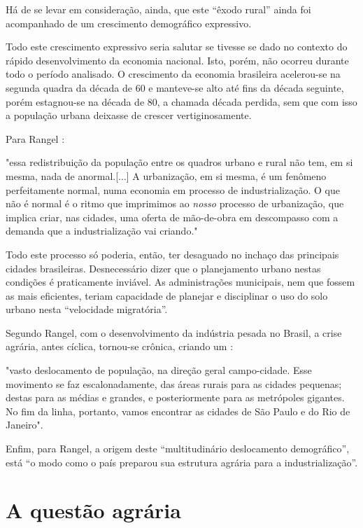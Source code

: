 \documentclass[
	12pt,				%
	oneside,			%
	a4paper,			%
	chapter=TITLE,		%
	section=TITLE,		%
	english,			%
	brazil				%
	]{abntex2}
\begin{document}
Há de se levar em consideração, ainda, que este ``êxodo rural'' ainda
foi acompanhado de um crescimento demográfico expressivo.

Todo este crescimento expressivo seria salutar se tivesse se dado no
contexto do rápido desenvolvimento da economia nacional. Isto, porém,
não ocorreu durante todo o período analisado. O crescimento da economia
brasileira acelerou-se na segunda quadra da década de 60 e manteve-se
alto até fins da década seguinte, porém estagnou-se na década de 80, a
chamada década perdida, sem que com isso a população urbana deixasse de
crescer vertiginosamente.

Para Rangel \autocite*[151]{rangel1986a}:
\begin{citacao}
"essa redistribuição da população entre os quadros urbano e rural não tem, em si
mesma, nada de anormal.[...] A urbanização, em si mesma, é um fenômeno
perfeitamente normal, numa economia em processo de industrialização. O que não é
normal é o ritmo que imprimimos ao \emph{nosso} processo de urbanização, que
implica criar, nas cidades, uma oferta de mão-de-obra em descompasso com a
demanda que a industrialização vai criando."
\end{citacao}
Todo este processo só poderia, então, ter desaguado no inchaço das
principais cidades brasileiras. Desnecessário dizer que o planejamento
urbano nestas condições é praticamente inviável. As administrações
municipais, nem que fossem as mais eficientes, teriam capacidade de
planejar e disciplinar o uso do solo urbano nesta ``velocidade
migratória''.

Segundo Rangel, com o desenvolvimento da indústria pesada no Brasil, a
crise agrária, antes cíclica, tornou-se crônica, criando um
\autocite*[156-157]{rangel1988}:
\begin{citacao}
"vasto deslocamento de população, na direção geral campo-cidade. Esse movimento
se faz escalonadamente, das áreas rurais para as cidades pequenas; destas para
as médias e grandes, e posteriormente para as metrópoles gigantes. No fim da
linha, portanto, vamos encontrar as cidades de São Paulo e do Rio de Janeiro".
\end{citacao}
Enfim, para Rangel, a origem deste ``multitudinário deslocamento
demográfico'', está ``o modo como o país preparou sua estrutura agrária
para a industrialização''.

\section{A questão agrária}\label{a-questuxe3o-agruxe1ria}
\end{document}
